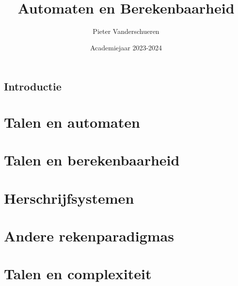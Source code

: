 \documentclass{exam}
\title{Automaten en Berekenbaarheid}
\author{Pieter Vanderschueren}
\date{Academiejaar 2023-2024}
\begin{document}
\begin{titlingpage}
\maketitle
\end{titlingpage}

\newpage

\vspace*{\fill}
\begin{center}
    
\section*{Introductie}

\end{center}
\vspace*{\fill}

\newpage

\tableofcontents

\newpage


\section{Talen en automaten}

\vspace{0.5cm}



\newpage

\section{Talen en berekenbaarheid}

\vspace{0.5cm}



\newpage

\section{Herschrijfsystemen}

\vspace{0.5cm}



\newpage

\section{Andere rekenparadigmas}

\vspace{0.5cm}



\newpage

\section{Talen en complexiteit}

\vspace{0.5cm}


\end{document}
